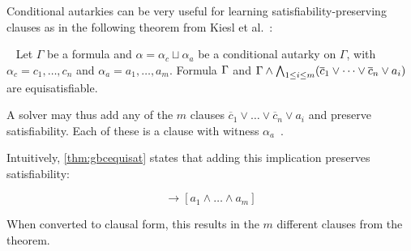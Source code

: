
Conditional autarkies can be very useful for learning satisfiability-preserving
clauses as in the
following theorem from Kiesl et al.~\cite{conditionalautarkies}:

\begin{theorem}~\label{thm:gbcequisat} Let $\Gamma$ be a formula and $\alpha =
    \alpha_c \sqcup \alpha_a$ be a conditional autarky on $\Gamma$, with
    $\alpha_c = c_1, \dots, c_n$ and $\alpha_a = a_1, \dots, a_m$. Formula
    $\Gamma$ and $\Gamma \land \bigwedge_{1 \leq i \leq m} (\overline{c}_1
    \lor \dots \lor \overline{c}_n \lor a_i)$ are equisatisfiable.
\end{theorem}


A solver may thus add any of the $m$ clauses
$\overline{c}_1 \lor \dots \lor \overline{c}_n \lor a_i$ and preserve
satisfiability. Each of these is a \pr clause with witness $\alpha_a$~\cite{conditionalautarkies}.

Intuitively, \autoref{thm:gbcequisat} states that adding this implication preserves satisfiability:

\begin{equation*}
    [c_1 \land \dots \land c_n] \rightarrow [a_1 \land \dots \land a_m]
\end{equation*}

When converted to clausal form, this results in the $m$ different clauses from the theorem.



